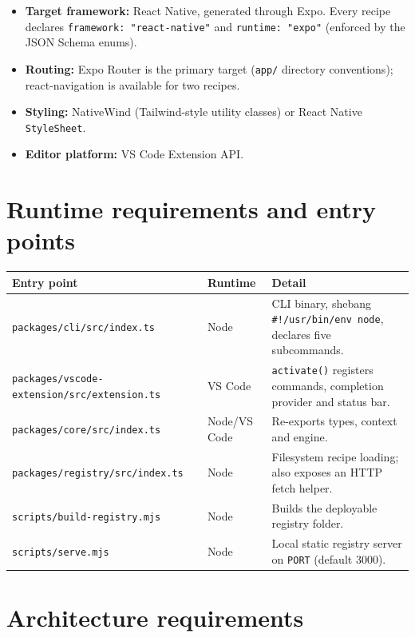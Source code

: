 \begin{itemize}
  \item \textbf{Target framework:} React Native, generated through Expo. Every
        recipe declares \texttt{framework: "react-native"} and
        \texttt{runtime: "expo"} (enforced by the JSON Schema enums).
  \item \textbf{Routing:} Expo Router is the primary target
        (\texttt{app/} directory conventions); react-navigation is available for
        two recipes.
  \item \textbf{Styling:} NativeWind (Tailwind-style utility classes) or React
        Native \texttt{StyleSheet}.
  \item \textbf{Editor platform:} VS Code Extension API.
\end{itemize}

\section{Runtime requirements and entry points}

\begin{longtable}{p{4cm}p{1.9cm}p{8.3cm}}
\toprule
\textbf{Entry point} & \textbf{Runtime} & \textbf{Detail} \\
\midrule
\endhead
\texttt{packages/cli/src/index.ts} & Node & CLI binary, shebang \texttt{\#!/usr/bin/env node},
declares five subcommands. \\
\texttt{packages/vscode-extension/src/extension.ts} & VS Code & \texttt{activate()} registers commands, completion provider and status bar. \\
\texttt{packages/core/src/index.ts} & Node/VS Code & Re-exports types, context and engine. \\
\texttt{packages/registry/src/index.ts} & Node & Filesystem recipe loading; also exposes an HTTP fetch helper. \\
\texttt{scripts/build-registry.mjs} & Node & Builds the deployable registry folder. \\
\texttt{scripts/serve.mjs} & Node & Local static registry server on \texttt{PORT} (default 3000). \\
\bottomrule
\end{longtable}

\section{Architecture requirements}

